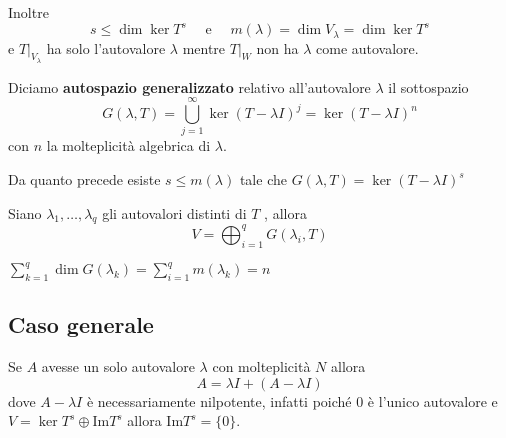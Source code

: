Inoltre 
\[
  s \le \dim \ker T^{s} \quad \text{ e } \quad m {(\lambda)} = \dim V_\lambda =
  \dim \ker T^{s}
\]
e \(T|_{V_\lambda} \) ha solo l'autovalore \(\lambda\) mentre \(T|_{W} \) non ha
\(\lambda\) come autovalore.
\begin{definition}
    Diciamo \textbf{autospazio generalizzato} relativo all'autovalore
    \(\lambda\) il sottospazio
    \[
        G{(\lambda, T)} = \bigcup_{j = 1} ^{\infty} \ker {(T - \lambda I)}^{j} =
        \ker {(T - \lambda I)}^{n}
    \]
    con \(n\) la molteplicità algebrica di \(\lambda\).
\end{definition}
Da quanto precede esiste \(s \le m {(\lambda)}\) tale che \(G{(\lambda, T)} =
\ker {(T - \lambda I)}^{ s }\) 

\begin{theorem}
    Siano \(\lambda_{1}, \dots, \lambda_q\) gli autovalori distinti di \(T\) ,
    allora
    \[
        V = \bigoplus_{i=1}^{q} G{(\lambda_{i}, T)}
    \]
\end{theorem}
\begin{remark}
    \(\sum_{k=1}^{q} \dim G {(\lambda_{k})} = \sum_{i=1}^{q} m {(\lambda_{k})} =
    n\) 
\end{remark}

\subsection{Caso generale}
Se \(A\) avesse un solo autovalore \(\lambda\) con molteplicità \(N\) allora
\[
  A = \lambda I + (A - \lambda I )
\]
dove \(A - \lambda I\) è necessariamente nilpotente, infatti poiché 0 è l'unico
autovalore e \(V = \ker T^{s} \oplus \mathrm{Im}T^{s}\) allora
\(\mathrm{Im}T^{s} = \{0\} \).

